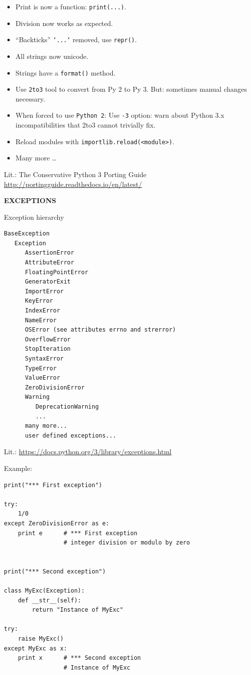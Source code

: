 \documentclass[9pt,a4wide]{extarticle}
\begin{document}
\begin{itemize}
\item Print is now a function: {\tt print(...)}.
\item Division now works as expected.
\item  "`Backticks"' {\tt `...`} removed, use {\tt repr()}.
\item All strings now unicode.
\item Strings have a {\tt format()} method.
\item Use {\tt 2to3} tool to convert from Py 2 to Py 3. But: sometimes
   manual changes necessary.
\item When forced to use {\tt Python 2}: Use {\tt -3} option: warn about 
   Python 3.x incompatibilities that 2to3 cannot trivially fix.
\item Reload modules with {\tt importlib.reload(<module>)}. 
\item Many more \dots{}

\end{itemize}

Lit.: The Conservative Python 3 Porting Guide
      \url{http://portingguide.readthedocs.io/en/latest/}


\bigskip
{\LARGE\bf EXCEPTIONS}
{}

Exception hierarchy

\begin{verbatim}
BaseException
   Exception
      AssertionError
      AttributeError
      FloatingPointError
      GeneratorExit
      ImportError
      KeyError
      IndexError
      NameError
      OSError (see attributes errno and strerror)
      OverflowError
      StopIteration
      SyntaxError
      TypeError
      ValueError
      ZeroDivisionError
      Warning
         DeprecationWarning
         ...
      many more...
      user defined exceptions...
\end{verbatim}

Lit.: \url{https://docs.python.org/3/library/exceptions.html}

\medskip

Example:

\medskip

\begin{verbatim}
print("*** First exception")

try:
    1/0
except ZeroDivisionError as e:
    print e      # *** First exception
                 # integer division or modulo by zero


print("*** Second exception")

class MyExc(Exception):
    def __str__(self):
        return "Instance of MyExc"

try:
    raise MyExc()
except MyExc as x:
    print x      # *** Second exception
                 # Instance of MyExc
\end{verbatim}
\end{document}

